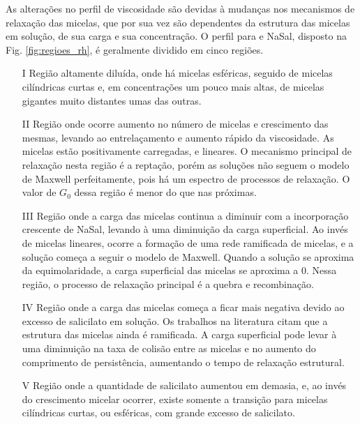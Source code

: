 		As alterações no perfil de viscosidade são devidas à mudanças nos mecanismos de relaxação das micelas, que por sua vez são dependentes da estrutura das micelas em solução, de sua carga e sua concentração. O perfil para \CTAB{} e NaSal, disposto na Fig. \ref{fig:regioes_rh}, é geralmente dividido em cinco regiões.
		
		\begin{enumerate} 
			\item[I] Região altamente diluída, onde há micelas esféricas, seguido de micelas cilíndricas curtas e, em concentrações um pouco mais altas, de micelas gigantes muito distantes umas das outras.
			\item[II] Região onde ocorre aumento no número de micelas e crescimento das mesmas, levando ao entrelaçamento e aumento rápido da viscosidade. As micelas estão positivamente carregadas, e lineares. O mecanismo principal de relaxação nesta região é a reptação, porém as soluções não seguem o modelo de Maxwell perfeitamente, pois há um espectro de processos de relaxação. %
			 O valor de \(G_0\) dessa região é menor do que nas próximas. %
			\item[III] Região onde a carga das micelas continua a diminuir com a incorporação crescente de NaSal, levando à uma diminuição da carga superficial. Ao invés de micelas lineares, ocorre a formação de uma rede ramificada de micelas, e a solução começa a seguir o modelo de Maxwell. Quando a solução se aproxima da equimolaridade, a carga superficial das micelas se aproxima a 0. Nessa região, o processo de relaxação principal é a quebra e recombinação.
			\item[IV] Região onde a carga das micelas começa a ficar mais negativa devido ao excesso de salicilato em solução. Os trabalhos na literatura citam que a estrutura das micelas ainda é ramificada. A carga superficial pode levar à uma diminuição na taxa de colisão entre as micelas e no aumento do comprimento de persistência, aumentando o tempo de relaxação estrutural.
			\item[V] Região onde a quantidade de salicilato aumentou em demasia, e, ao invés do crescimento micelar ocorrer, existe somente a transição para micelas cilíndricas curtas, ou esféricas, com grande excesso de salicilato.
		\end{enumerate}
		
